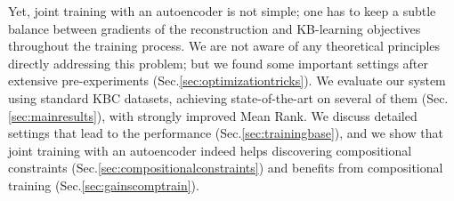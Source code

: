 \documentclass[11pt,a4paper]{article}
\begin{document}
Yet, joint training with an autoencoder is not simple; one has to keep a subtle balance between 
gradients of the reconstruction and KB-learning objectives throughout the training process. 
We are not aware of any theoretical principles directly addressing this problem; but we found some 
important settings after extensive pre-experiments (Sec.\ref{sec:optimizationtricks}). We evaluate our system using standard 
KBC datasets, achieving state-of-the-art on several of them (Sec.\ref{sec:mainresults}), with 
strongly improved Mean Rank. 
We discuss 
detailed settings that lead to the performance (Sec.\ref{sec:trainingbase}), 
and we show that joint training with 
an autoencoder indeed helps discovering 
compositional constraints (Sec.\ref{sec:compositionalconstraints}) and benefits from 
compositional training (Sec.\ref{sec:gainscomptrain}). 





\end{document}
